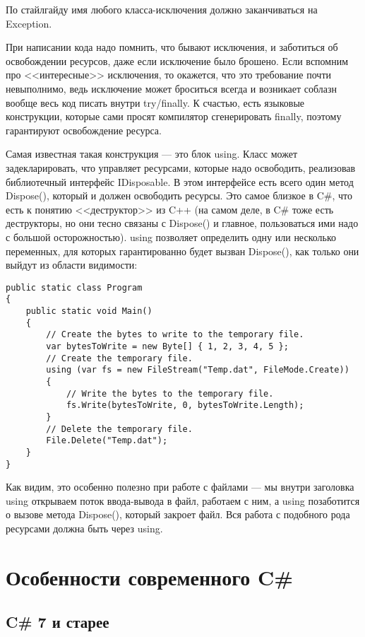 \documentclass[a5paper]{article}
\begin{document}
По стайлгайду имя любого класса-исключения должно заканчиваться на Exception.

При написании кода надо помнить, что бывают исключения, и заботиться об освобождении ресурсов, даже если исключение было брошено. Если вспомним про <<интересные>> исключения, то окажется, что это требование почти невыполнимо, ведь исключение может броситься всегда и возникает соблазн вообще весь код писать внутри try/finally. К счастью, есть языковые конструкции, которые сами просят компилятор сгенерировать finally, поэтому гарантируют освобождение ресурса.

Самая известная такая конструкция --- это блок using. Класс может задекларировать, что управляет ресурсами, которые надо освободить, реализовав библиотечный интерфейс IDisposable. В этом интерфейсе есть всего один метод Dispose(), который и должен освободить ресурсы. Это самое близкое в C\#, что есть к понятию <<деструктор>> из C++ (на самом деле, в C\# тоже есть деструкторы, но они тесно связаны с Dispose() и главное, пользоваться ими надо с большой осторожностью). using позволяет определить одну или несколько переменных, для которых гарантированно будет вызван Dispose(), как только они выйдут из области видимости:

\begin{verbatim}
public static class Program 
{
    public static void Main() 
    {
        // Create the bytes to write to the temporary file.
        var bytesToWrite = new Byte[] { 1, 2, 3, 4, 5 };
        // Create the temporary file.
        using (var fs = new FileStream("Temp.dat", FileMode.Create)) 
        {
            // Write the bytes to the temporary file.
            fs.Write(bytesToWrite, 0, bytesToWrite.Length);
        }
        // Delete the temporary file.
        File.Delete("Temp.dat");
    }
}
\end{verbatim}

Как видим, это особенно полезно при работе с файлами --- мы внутри заголовка using открываем поток ввода-вывода в файл, работаем с ним, а using позаботится о вызове метода Dispose(), который закроет файл. Вся работа с подобного рода ресурсами должна быть через using.

\section{Особенности современного C\#}

\subsection{C\# 7 и старее}
\end{document}
